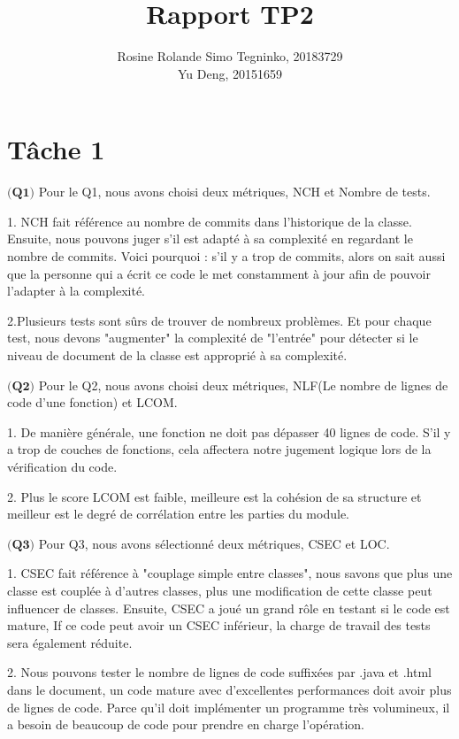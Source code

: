 \documentclass{article}
\title{Rapport TP2}
\author{Rosine Rolande Simo Tegninko, 20183729\\
Yu Deng, 20151659}
\date{}
\begin{document}
\maketitle

\section*{Tâche 1}

\item$\textbf{(Q1)}$
Pour le Q1, nous avons choisi deux métriques, NCH et Nombre de tests.

1.	NCH fait référence au nombre de commits dans l'historique de la classe. Ensuite, nous pouvons juger s'il est adapté à sa complexité en regardant le nombre de commits. Voici pourquoi : s'il y a trop de commits, alors on sait aussi que la personne qui a écrit ce code le met constamment à jour afin de pouvoir l'adapter à la complexité.

2.Plusieurs tests sont sûrs de trouver de nombreux problèmes. Et pour chaque test, nous devons "augmenter" la complexité de "l'entrée" pour détecter si le niveau de document de la classe est approprié à sa complexité.


\item $\textbf{(Q2)}$
Pour le Q2, nous avons choisi deux métriques, NLF(Le nombre de lignes de code d’une fonction) et LCOM.

1. De manière générale, une fonction ne doit pas dépasser 40 lignes de code. S'il y a trop de couches de fonctions, cela affectera notre jugement logique lors de la vérification du code.

2. Plus le score LCOM est faible, meilleure est la cohésion de sa structure et meilleur est le degré de corrélation entre les parties du module.


\item$\textbf{(Q3)}$
Pour Q3, nous avons sélectionné deux métriques, CSEC et LOC.


1. CSEC fait référence à "couplage simple entre classes", nous savons que plus une classe est couplée à d'autres classes, plus une modification de cette classe peut influencer de classes. Ensuite, CSEC a joué un grand rôle en testant si le code est mature, If ce code peut avoir un CSEC inférieur, la charge de travail des tests sera également réduite.

2. Nous pouvons tester le nombre de lignes de code suffixées par .java et .html dans le document, un code mature avec d'excellentes performances doit avoir plus de lignes de code. Parce qu'il doit implémenter un programme très volumineux, il a besoin de beaucoup de code pour prendre en charge l'opération.
\end{document}
